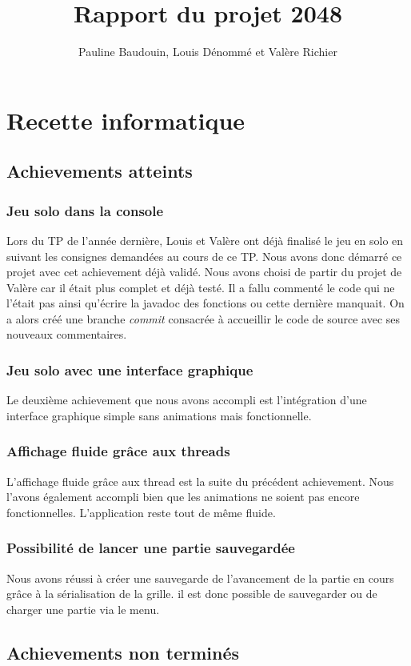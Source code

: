 \documentclass[a4paper,10pt]{report}
\title{Rapport du projet 2048}
\author{Pauline Baudouin, Louis Dénommé et Valère Richier}
\begin{document}
\maketitle
\part{Recette informatique}
 \chapter{Achievements atteints}
   \section{Jeu solo dans la console}
     Lors du TP de l'année dernière, Louis et Valère ont déjà finalisé le jeu en solo en suivant les consignes demandées au cours de ce TP.
     Nous avons donc démarré ce projet avec cet achievement déjà validé. Nous avons choisi de partir du projet de Valère car il était plus complet et déjà testé.
     Il a fallu commenté le code qui ne l'était pas ainsi qu'écrire la javadoc des fonctions ou cette dernière manquait. On a alors créé une branche \textit{commit} consacrée à accueillir le code de source avec ses nouveaux commentaires.
   \section{Jeu solo avec une interface graphique}
     Le deuxième achievement que nous avons accompli est l'intégration d'une interface graphique simple sans animations mais fonctionnelle.
   \section{Affichage fluide grâce aux threads}
     L'affichage fluide grâce aux thread est la suite du précédent achievement. Nous l'avons également accompli bien que les animations ne soient pas encore fonctionnelles.
     L'application reste tout de même fluide.
   \section{Possibilité de lancer une partie sauvegardée}
     Nous avons réussi à créer une sauvegarde de l'avancement de la partie en cours grâce à la sérialisation de la grille. il est donc possible de sauvegarder ou de charger une partie via le menu.
 \chapter{Achievements non terminés}
\end{document}
